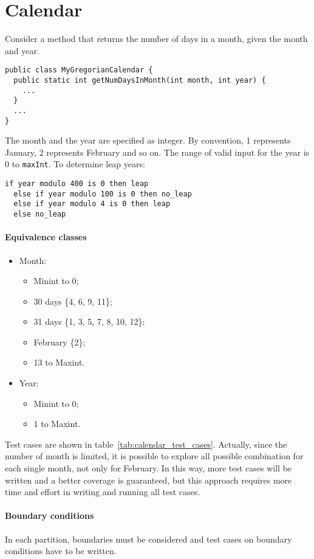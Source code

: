 \section{Calendar}
Consider a method that returns the number of days in a month, given the month and year.
\begin{verbatim}
public class MyGregorianCalendar {
  public static int getNumDaysInMonth(int month, int year) {
    ...
  }
  ...
}
\end{verbatim}
The month and the year are specified as integer. By convention, 1 represents January, 2 represents February and so on. The range of valid input for the year is 0 to \texttt{maxInt}. To determine leap years:
\begin{verbatim}
if year modulo 400 is 0 then leap
  else if year modulo 100 is 0 then no_leap
  else if year modulo 4 is 0 then leap
  else no_leap
\end{verbatim}

\paragraph{Equivalence classes}

\begin{itemize}
\item Month:
\begin{itemize}
\item Minint to 0;
\item 30 days \{4, 6, 9, 11\};
\item 31 days \{1, 3, 5, 7, 8, 10, 12\};
\item February \{2\};
\item 13 to Maxint.
\end{itemize}
\item Year:
\begin{itemize}
\item Minint to 0;
\item 1 to Maxint.
\end{itemize}
\end{itemize}
Test cases are shown in table~\ref{tab:calendar_test_cases}. Actually, since the number of month is limited, it is possible to explore all possible combination for each single month, not only for February. In this way, more test cases will be written and a better coverage is guaranteed, but this approach requires more time and effort in writing and running all test cases.

\paragraph{Boundary conditions}
In each partition, boundaries must be considered and test cases on boundary conditions have to be written.

